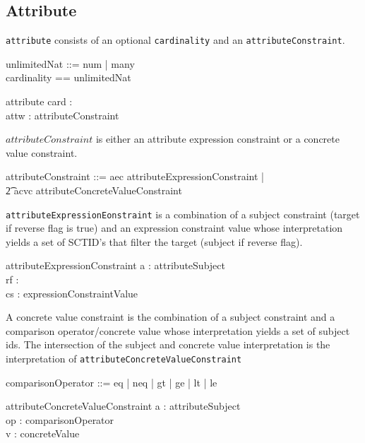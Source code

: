 \documentclass{article}
\def\spec#1{{\tt #1}}
\begin{document}
\subsection{Attribute}
\spec{attribute} consists of an optional \spec{cardinality} and an \spec{attributeConstraint}.
\begin{zed}
unlimitedNat ::= num \ldata \nat \rdata | many \\
cardinality == \nat \cross unlimitedNat \\
\end{zed}
\begin{schema}{attribute}
   card : \optional[cardinality] \\
   attw : attributeConstraint
\end{schema}

$attributeConstraint$ is either an attribute expression constraint or a concrete value constraint.
\begin{zed}
attributeConstraint ::= aec \ldata attributeExpressionConstraint \rdata | \\
\t2 acvc \ldata attributeConcreteValueConstraint \rdata \\
\end{zed}

\spec{attributeExpressionEonstraint} is a combination of a subject constraint (target if reverse flag is true) and an
expression constraint value whose interpretation yields a set of SCTID's that filter the target (subject if reverse flag).
\begin{zed}
[reverseFlag] 
\end{zed}
\begin{schema}{attributeExpressionConstraint}
   a : attributeSubject \\
   rf : \optional[reverseFlag] \\
   cs : expressionConstraintValue
\end{schema}

A concrete value constraint is the combination of a subject constraint and a comparison operator/concrete value 
whose interpretation yields a set of subject ids.  The intersection of the subject and concrete value interpretation
is the interpretation of \spec{attributeConcreteValueConstraint}
\begin{zed}
comparisonOperator ::= eq | neq | gt | ge | lt | le 
\end{zed}
\begin{schema}{attributeConcreteValueConstraint}
   a : attributeSubject \\
   op : comparisonOperator \\
   v : concreteValue
\end{schema}
\end{document}
